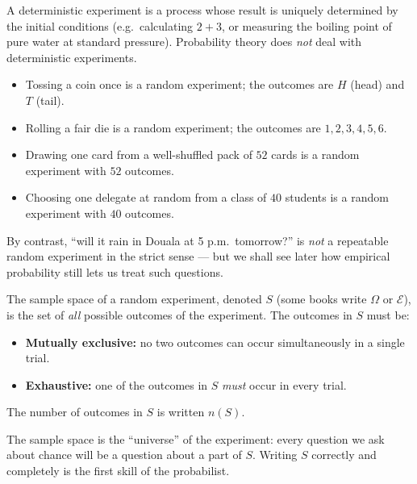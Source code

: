 \documentclass[11pt]{article}
\newcommand{\cle}[1]{{\popxbold\color{popdark}#1}}
\newcounter{popsec}
\newcounter{popsub}
\newcommand{\courssub}[1]{%
  \stepcounter{popsub}%
  \par\vspace{9pt}\noindent{\popxbold\fontsize{11.5}{13}\selectfont\color{popink}{\color{poporange}\thepopsec.\thepopsub}\hspace{6pt}#1}\par\nopagebreak\vspace{4pt}
}
\begin{document}
\begin{definition}
A \cle{deterministic experiment} is a process whose result is uniquely determined by the initial conditions (e.g.\ calculating $2+3$, or measuring the boiling point of pure water at standard pressure). Probability theory does \emph{not} deal with deterministic experiments.
\end{definition}

\begin{exemplebox}
\begin{itemize}
\item Tossing a coin once is a random experiment; the outcomes are $H$ (head) and $T$ (tail).
\item Rolling a fair die is a random experiment; the outcomes are $1, 2, 3, 4, 5, 6$.
\item Drawing one card from a well-shuffled pack of $52$ cards is a random experiment with $52$ outcomes.
\item Choosing one delegate at random from a class of $40$ students is a random experiment with $40$ outcomes.
\end{itemize}
By contrast, ``will it rain in Douala at 5 p.m.\ tomorrow?'' is \emph{not} a repeatable random experiment in the strict sense --- but we shall see later how empirical probability still lets us treat such questions.
\end{exemplebox}

\courssub{The Sample Space}

\begin{definition}
The \cle{sample space} of a random experiment, denoted $S$ (some books write $\Omega$ or $\mathcal{E}$), is the set of \emph{all} possible outcomes of the experiment. The outcomes in $S$ must be:
\begin{itemize}
\item \textbf{Mutually exclusive:} no two outcomes can occur simultaneously in a single trial.
\item \textbf{Exhaustive:} one of the outcomes in $S$ \emph{must} occur in every trial.
\end{itemize}
The number of outcomes in $S$ is written $n(S)$.
\end{definition}

The sample space is the ``universe'' of the experiment: every question we ask about chance will be a question about a part of $S$. Writing $S$ correctly and completely is the first skill of the probabilist.
\end{document}
